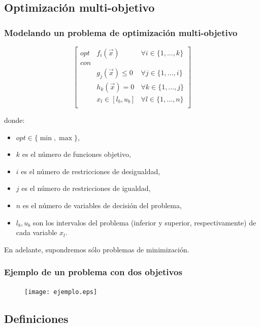\documentclass[10pt,compress]{beamer}
\begin{document}
\subsection{Optimizaci\'on multi-objetivo}
    \begin{frame}
		\frametitle{Modelando un problema de optimizaci\'on multi-objetivo}
		\[
		\left[\begin{array}{ccc}
			opt & f_i(\vec{x}) & \forall i \in \{1,...,k\} \\
			con &  & \\
				& g_j(\vec{x}) \leq 0 & \forall j \in \{1,...,i\} \\
				& h_k(\vec{x}) = 0 & \forall k \in \{1,...,j\} \\
				& x_l \in [l_b, u_b] & \forall l \in \{1,...,n\} \\
		\end{array}\right]
		\]
    \begin{block}{donde:}
	  \begin{itemize}
			\item $opt \in \{\min, \max\}$,
			\item $k$ es el n\'umero de funciones objetivo,
			\item $i$ es el n\'umero de restricciones de desigualdad,
			\item $j$ es el n\'umero de restricciones de igualdad,
			\item $n$ es el n\'umero de variables de decisi\'on del problema,
			\item $l_b, u_b$ son los intervalos del problema (inferior y superior, respectivamente) de cada variable $x_l$.
	  \end{itemize}
	\end{block}
	En adelante,  supondremos s\'olo problemas de minimizaci\'on.
\end{frame}
\begin{frame}
	\frametitle{Ejemplo de un problema con dos objetivos}	
		\begin{figure}[h!]
			\centering
				\texttt{[image: ejemplo.eps]}
				
     \end{figure}
\end{frame}
  \subsection{Definiciones}
	
\end{document}

